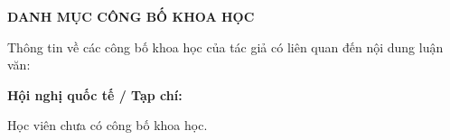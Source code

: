 \newpage
\pagestyle{fancy}

\setcounter{tocdepth}{0}

\begin{center}
    \Large \textbf{DANH MỤC CÔNG BỐ KHOA HỌC}
\end{center}

Thông tin về các công bố khoa học của tác giả có liên quan đến nội dung luận văn:

\noindent\textbf{Hội nghị quốc tế / Tạp chí:}

Học viên chưa có công bố khoa học.

%     


